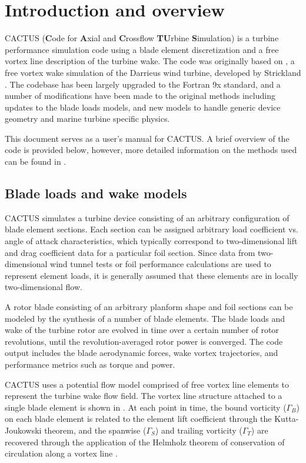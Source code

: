 \chapter{Introduction and overview}
CACTUS (\textbf{C}ode for \textbf{A}xial and \textbf{C}rossflow \textbf{TU}rbine \textbf{S}imulation) is a turbine performance simulation code using a blade element discretization and a free vortex line description of the turbine wake. The code was originally based on , a free vortex wake simulation of the Darrieus wind turbine, developed by Strickland \cite{Strickland1979}. The codebase has been largely upgraded to the Fortran 9x standard, and a number of modifications have been made to the original  methods including updates to the blade loads models, and new models to handle generic device geometry and marine turbine specific physics.

This document serves as a user's manual for CACTUS. A brief overview of the code is provided below, however, more detailed information on the methods used can be found in \cite{Murray2011}. 

\section{Blade loads and wake models}
CACTUS simulates a turbine device consisting of an arbitrary configuration of blade element sections. Each section can be assigned arbitrary load coefficient vs. angle of attack characteristics, which typically correspond to two-dimensional lift and drag coefficient data for a particular foil section. Since data from two-dimensional wind tunnel tests or foil performance calculations are used to represent element loads, it is generally assumed that these elements are in locally two-dimensional flow. 

A rotor blade consisting of an arbitrary planform shape and foil sections can be modeled by the synthesis of a number of blade elements. The blade loads and wake of the turbine rotor are evolved in time over a certain number of rotor revolutions, until the revolution-averaged rotor power is converged.  The code output includes the blade aerodynamic forces, wake vortex trajectories, and performance metrics such as torque and power.  

CACTUS uses a potential flow model comprised of free vortex line elements to represent the turbine wake flow field. The vortex line structure attached to a single blade element is shown in . At each point in time, the bound vorticity ($\Gamma_B$) on each blade element is related to the element lift coefficient through the Kutta-Joukowski theorem, and the spanwise ($\Gamma_S$) and trailing vorticity ($\Gamma_T$) are recovered through the application of the Helmholz theorem of conservation of circulation along a vortex line \cite{katz2001low}.

